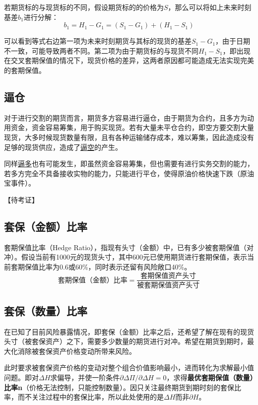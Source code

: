 \documentclass[11pt]{article}
\begin{document}
若期货标的与现货标的不同，假设期货标的的价格为$S$，那么可以将如上未来时刻基差$b_1$进行分解：
\begin{equation*}
    b_1 = H_1 - G_1 = (S_1 - G_1) + (H_1 - S_1)
\end{equation*}

可以看到等式右边第一项为未来时刻期货与其标的现货的基差$S_1 - G_1$，由于日期不一致，可能导致两者不同。第二项为由于期货标的与现货不同$H_1 - S_1$，即出现在交叉套期保值的情况下，现货价格的差异，这两者原因都可能造成无法实现完美的套期保值。

\subsection*{逼仓}

对于进行交割的期货而言，期货多方容易进行逼仓，由于期货为合约，且多方为动用资金，资金容易筹集，用于购买现货。若有大量未平仓合约，即空方要交割大量现货，大多时候现货数量有限，且有各种运输储存成本，难以筹集，因此造成没有足够的现货供应，造成了\uline{逼空}的产生。

同样\uline{逼多}也有可能发生，即虽然资金容易筹集，但也需要有进行实务交割的能力，若多方完全不具备接收实物的能力，只能进行平仓，使得原油价格快速下跌（原油宝事件）。

【待考证】

\subsection{套保（金额）比率}

套期保值比率（Hedge Ratio），指现有头寸（金额）中，已有多少被套期保值（对冲）。假设当前有1000元的现货头寸，其中600元已使用期货进行套期保值，表示当前套期保值比率为0.6或60\%，同时表示还留有风险敞口40\%。
\begin{equation*}
   \text{套期保值（金额）比率} = \frac{\text{套期保值资产头寸}}{\text{被套期保值资产头寸}}
\end{equation*}

\subsection{套保（数量）比率}

在已知了目前风险暴露情况，即套保（金额）比率之后，还希望了解在现有的现货头寸（被套保资产）之下，需要多少数量的期货进行对冲。希望在期货到期时，最大化消除被套保资产价格变动所带来风险。

此时要求被套保资产价格的变动对整个组合价值影响最小，进而转化为求解最小值问题。即对$\Delta H$求偏导，并使一阶条件$\partial\Delta\Pi / \partial \Delta H = 0$，求得\textbf{最优套期保值（数量）比率n}（价格无法控制，只能控制数量）。因只关注最终期货到期时刻的套保比率，而不关注过程中的套保比率，所以此处使用的是$\Delta H$而非$\partial H$。
\end{document}
